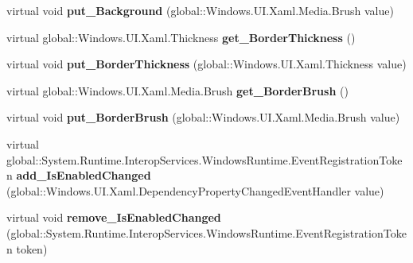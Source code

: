 \begin{DoxyCompactItemize}
\mbox{\label{class_windows_1_1_u_i_1_1_xaml_1_1_controls_1_1_control_abc00b1110cfb2ca8076ac8356a548d78}} 
virtual void {\bfseries put\+\_\+\+Background} (global\+::\+Windows.\+U\+I.\+Xaml.\+Media.\+Brush value)
\item 
\mbox{\label{class_windows_1_1_u_i_1_1_xaml_1_1_controls_1_1_control_ab76eb28c6756bacca0cc41591940408d}} 
virtual global\+::\+Windows.\+U\+I.\+Xaml.\+Thickness {\bfseries get\+\_\+\+Border\+Thickness} ()
\item 
\mbox{\label{class_windows_1_1_u_i_1_1_xaml_1_1_controls_1_1_control_a4a02a62301b0458bfefc9d7c25b6511e}} 
virtual void {\bfseries put\+\_\+\+Border\+Thickness} (global\+::\+Windows.\+U\+I.\+Xaml.\+Thickness value)
\item 
\mbox{\label{class_windows_1_1_u_i_1_1_xaml_1_1_controls_1_1_control_a71ff5e84affd65e6419e6e3f9a2292b9}} 
virtual global\+::\+Windows.\+U\+I.\+Xaml.\+Media.\+Brush {\bfseries get\+\_\+\+Border\+Brush} ()
\item 
\mbox{\label{class_windows_1_1_u_i_1_1_xaml_1_1_controls_1_1_control_a551a318818f8d5853d61b020af44db11}} 
virtual void {\bfseries put\+\_\+\+Border\+Brush} (global\+::\+Windows.\+U\+I.\+Xaml.\+Media.\+Brush value)
\item 
\mbox{\label{class_windows_1_1_u_i_1_1_xaml_1_1_controls_1_1_control_a825185d5afd2516710efebaeb9350f9d}} 
virtual global\+::\+System.\+Runtime.\+Interop\+Services.\+Windows\+Runtime.\+Event\+Registration\+Token {\bfseries add\+\_\+\+Is\+Enabled\+Changed} (global\+::\+Windows.\+U\+I.\+Xaml.\+Dependency\+Property\+Changed\+Event\+Handler value)
\item 
\mbox{\label{class_windows_1_1_u_i_1_1_xaml_1_1_controls_1_1_control_ae6492dba1a06b7283e52b7e05df6ba01}} 
virtual void {\bfseries remove\+\_\+\+Is\+Enabled\+Changed} (global\+::\+System.\+Runtime.\+Interop\+Services.\+Windows\+Runtime.\+Event\+Registration\+Token token)

\end{DoxyCompactItemize}

